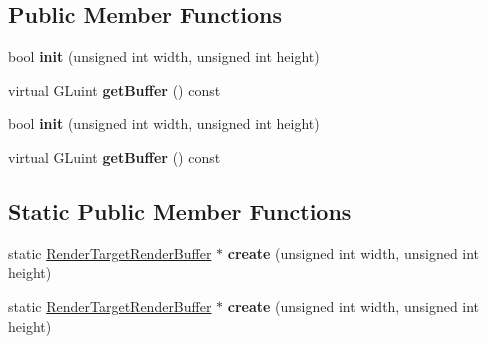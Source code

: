 \subsection*{Public Member Functions}
\begin{DoxyCompactItemize}
\item 
\mbox{\label{classexperimental_1_1RenderTargetRenderBuffer_ae2ceb91738af925174a7b15cdcb59173}} 
bool {\bfseries init} (unsigned int width, unsigned int height)
\item 
\mbox{\label{classexperimental_1_1RenderTargetRenderBuffer_adc3a1e4047d7d58afecab9e2ba0ef09a}} 
virtual G\+Luint {\bfseries get\+Buffer} () const
\item 
\mbox{\label{classexperimental_1_1RenderTargetRenderBuffer_ae2ceb91738af925174a7b15cdcb59173}} 
bool {\bfseries init} (unsigned int width, unsigned int height)
\item 
\mbox{\label{classexperimental_1_1RenderTargetRenderBuffer_adc3a1e4047d7d58afecab9e2ba0ef09a}} 
virtual G\+Luint {\bfseries get\+Buffer} () const
\end{DoxyCompactItemize}
\subsection*{Static Public Member Functions}
\begin{DoxyCompactItemize}
\item 
\mbox{\label{classexperimental_1_1RenderTargetRenderBuffer_a0dab877402c4cccbd3e60ddc14820ef3}} 
static \hyperlink{classexperimental_1_1RenderTargetRenderBuffer}{Render\+Target\+Render\+Buffer} $\ast$ {\bfseries create} (unsigned int width, unsigned int height)
\item 
\mbox{\label{classexperimental_1_1RenderTargetRenderBuffer_ad3835c48e96752525900197f6edc5b59}} 
static \hyperlink{classexperimental_1_1RenderTargetRenderBuffer}{Render\+Target\+Render\+Buffer} $\ast$ {\bfseries create} (unsigned int width, unsigned int height)
\end{DoxyCompactItemize}
